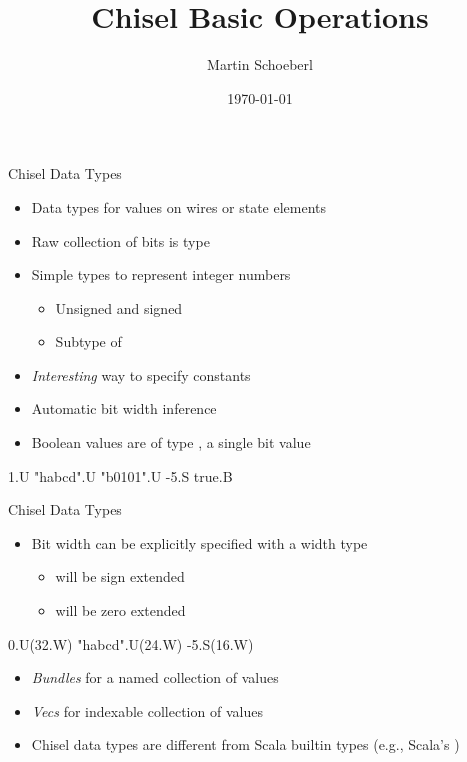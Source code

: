 

\newif\ifbook


\title{Chisel Basic Operations}
\author{Martin Schoeberl}
\date{\today}



\begin{frame}
\titlepage
\end{frame}

\begin{frame}[fragile]{Chisel Data Types}
\begin{itemize}
\item Data types for values on wires or state elements
\item Raw collection of bits is type 
\item Simple types to represent integer numbers
\begin{itemize}
\item Unsigned and signed
\item Subtype of 
\end{itemize}
\item \emph{Interesting} way to specify constants
\item Automatic bit width inference
\item Boolean values are of type , a single bit value
\end{itemize}
\begin{chisel}
1.U
"habcd".U
"b0101".U
-5.S
true.B
\end{chisel}
\end{frame}

\begin{frame}[fragile]{Chisel Data Types}
\begin{itemize}
\item Bit width can be explicitly specified with a width type
\begin{itemize}
\item {} will be sign extended
\item {} will be zero extended
\end{itemize}
\end{itemize}
\begin{chisel}
0.U(32.W)
"habcd".U(24.W)
-5.S(16.W)
\end{chisel}
\begin{itemize}
\item \emph{Bundles} for a named collection of values
\item \emph{Vecs} for indexable collection of values
\item Chisel data types are different from Scala builtin types (e.g., Scala's )
\end{itemize}
\end{frame}

